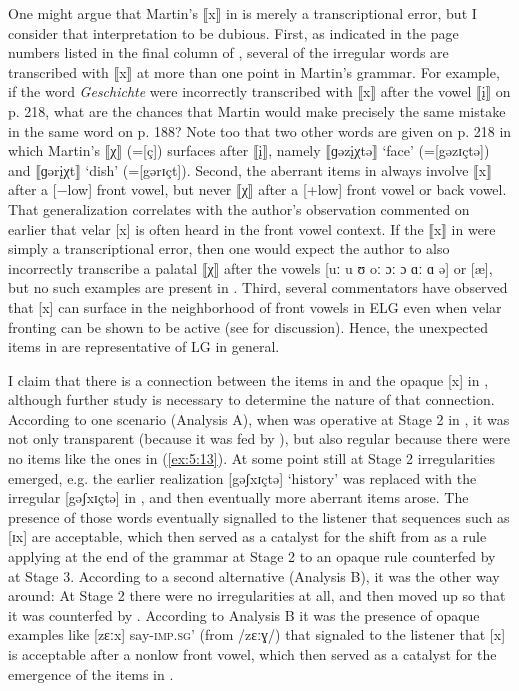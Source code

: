 One might argue that Martin’s ⟦x⟧ in  is merely a transcriptional error, but I consider that interpretation to be dubious. First, as indicated in the page numbers listed in the final column of , several of the irregular words are transcribed with ⟦x⟧ at more than one point in Martin’s grammar. For example, if the word \textit{Geschichte} were incorrectly transcribed with ⟦x⟧ after the vowel ⟦\k{i}⟧ on p. 218, what are the chances that Martin would make precisely the same mistake in the same word on p. 188? Note too that two other words are given on p. 218 in which Martin’s ⟦χ⟧ (=[ç]) surfaces after ⟦\k{i}⟧, namely ⟦ɡəz\k{i}χtə⟧ ‘face’ (=[gəzɪçtə]) and ⟦ɡər\k{i}χt⟧ ‘dish’ (=[gərɪçt]). Second, the aberrant items in  always involve ⟦x⟧ after a [−low] front vowel, but never ⟦χ⟧ after a [+low] front vowel or back vowel. That generalization correlates with the author’s observation commented on earlier that velar [x] is often heard in the front vowel context. If the ⟦x⟧ in  were simply a transcriptional error, then one would expect the author to also incorrectly transcribe a palatal ⟦χ⟧ after the vowels [uː u ʊ oː ɔː ɔ ɑː ɑ ə] or [æ], but no such examples are present in \citet{Martin1925}. Third, several commentators have observed that [x] can surface in the neighborhood of front vowels in ELG even when velar fronting can be shown to be active (see  for discussion). Hence, the unexpected items in  are representative of LG in general.

I claim that there is a connection between the items in  and the opaque [x] in , although further study is necessary to determine the nature of that connection. According to one scenario (Analysis A), when  was operative at Stage 2 in , it was not only transparent (because it was fed by ), but also regular because there were no items like the ones in (\ref{ex:5:13}). At some point still at Stage 2 irregularities emerged, e.g. the earlier realization [gəʃxɪçtə] ‘history’ was replaced with the irregular [gəʃxɪçtə] in , and then eventually more aberrant items arose. The presence of those words eventually signalled to the listener that sequences such as [ɪx] are acceptable, which then served as a catalyst for the shift from  as a rule applying at the end of the grammar at Stage 2 to an opaque rule counterfed by  at Stage 3. According to a second alternative (Analysis B), it was the other way around: At Stage 2 there were no irregularities at all, and then  moved up so that it was counterfed by . According to Analysis B it was the presence of opaque examples like [zɛːx] say-\textsc{imp}.\textsc{sg}’ (from /zɛːɣ/) that signaled to the listener that [x] is acceptable after a nonlow front vowel, which then served as a catalyst for the emergence of the items in .

